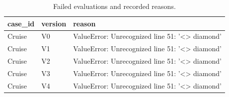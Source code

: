\begin{table}

\caption{Failed evaluations and recorded reasons.}
\centering
\begin{tabular}[t]{lll}
\toprule
case\_id & version & reason\\
\midrule
Cruise & V0 & ValueError: Unrecognized line 51: '<> diamond'\\
Cruise & V1 & ValueError: Unrecognized line 51: '<> diamond'\\
Cruise & V2 & ValueError: Unrecognized line 51: '<> diamond'\\
Cruise & V3 & ValueError: Unrecognized line 51: '<> diamond'\\
Cruise & V4 & ValueError: Unrecognized line 51: '<> diamond'\\
\bottomrule
\end{tabular}
\end{table}
